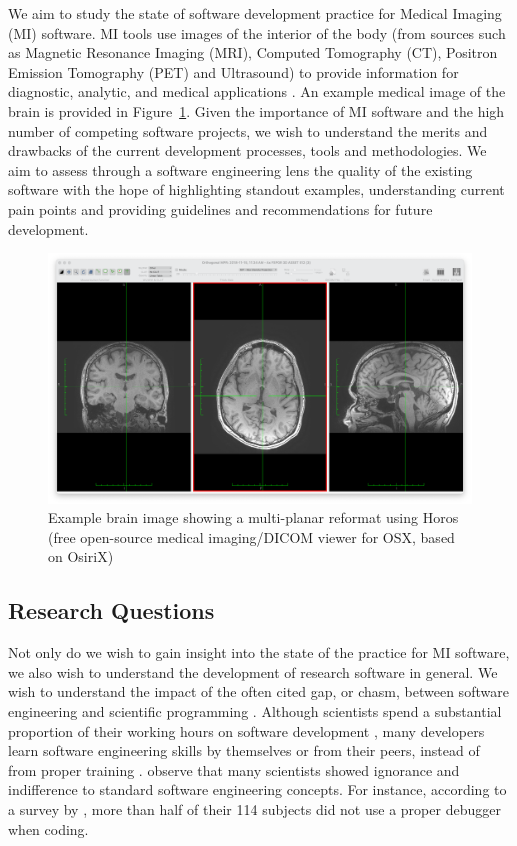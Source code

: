 \documentclass[final, 3p, times, authoryear]{elsarticle}
\begin{document}
We aim to study the state of software development practice for Medical Imaging
(MI) software.  MI tools use images of the interior of the body (from sources
such as Magnetic Resonance Imaging (MRI), Computed Tomography (CT), Positron
Emission Tomography (PET) and Ultrasound) to provide information for diagnostic,
analytic, and medical applications \citep{FDA2021, enwiki:1034887445,
Zhang2008}.  An example medical image of the brain is provided in
Figure~\ref{Fig_Example}. Given the importance of MI software and the high
number of competing software projects, we wish to understand the merits and
drawbacks of the current development processes, tools and methodologies.  We aim
to assess through a software engineering lens the quality of the existing
software with the hope of highlighting standout examples, understanding current
pain points and providing guidelines and recommendations for future development.

\begin{figure}[!ht]
    \begin{center}
        \includegraphics[scale=0.25]{figures/MPR.png}        
    \end{center}
    \caption{Example brain image showing a multi-planar reformat using Horos (free open-source medical imaging/DICOM viewer for OSX, based on OsiriX)}
    \label{Fig_Example}
\end{figure}
    
\subsection{Research Questions} \label{sec_motivation}

Not only do we wish to gain insight into the state of the practice for MI
software, we also wish to understand the development of research software in
general. We wish to understand the impact of the often cited gap, or chasm,
between software engineering and scientific programming \citep{Kelly2007,
Storer2017}. Although scientists spend a substantial proportion of their working
hours on software development \citep{Hannay2009, Prabhu2011}, many developers
learn software engineering skills by themselves or from their peers, instead of
from proper training \citep{Hannay2009}. \citet{Hannay2009} observe that many
scientists showed ignorance and indifference to standard software engineering
concepts. For instance, according to a survey by \citet{Prabhu2011}, more than
half of their 114 subjects did not use a proper debugger when coding.
\end{document}
